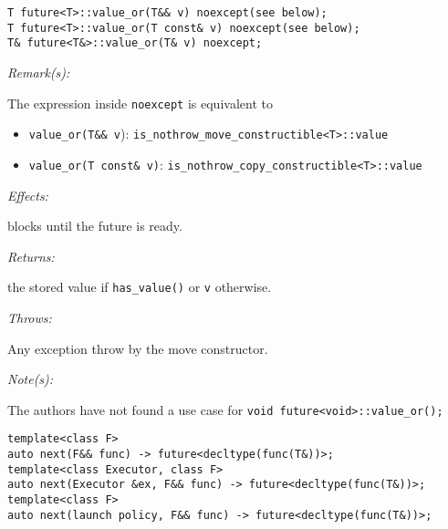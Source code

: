 \documentclass[a4paper,10pt]{article}
\newcommand{\cpp}[1]{\lstinline{#1}}
\newcommand{\wordingItem}[1]{\noindent\textit{#1:}}
\newenvironment{wordingPara}{\begin{adjustwidth}{12pt}{}}{\end{adjustwidth}}
\newenvironment{Effects}{\wordingItem{Effects}\vspace{7pt}\noindent\begin{adjustwidth}{12pt}{}}{\vspace{7pt}\end{adjustwidth}}
\newenvironment{Throws}{\wordingItem{Throws}\vspace{7pt}\noindent\begin{adjustwidth}{12pt}{}}{\vspace{7pt}\end{adjustwidth}}
\newenvironment{Returns}{\wordingItem{Returns}\vspace{7pt}\noindent\begin{adjustwidth}{12pt}{}}{\vspace{7pt}\end{adjustwidth}}
\newenvironment{Remarks}{\wordingItem{Remark(s)}\vspace{7pt}\noindent\begin{adjustwidth}{12pt}{}}{\vspace{7pt}\end{adjustwidth}}
\newenvironment{Notes}{\wordingItem{Note(s)}\vspace{7pt}\noindent\begin{adjustwidth}{12pt}{}}{\vspace{7pt}\end{adjustwidth}}
\newcommand{\update}[1]{\colorbox{update_color}{#1}}
\begin{document}
\begin{lstlisting}[xleftmargin=0pt]
T future<T>::value_or(T&& v) noexcept(see below);
T future<T>::value_or(T const& v) noexcept(see below);
T& future<T&>::value_or(T& v) noexcept;
\end{lstlisting}
\begin{wordingPara}
 
\begin{Remarks}
The expression inside \cpp{noexcept} is equivalent to
\begin{itemize}
\item \cpp{value_or(T&& v}): \cpp{is_nothrow_move_constructible<T>::value}
\item \cpp{value_or(T const& v)}: \cpp{is_nothrow_copy_constructible<T>::value}
\end{itemize}
\end{Remarks}

\begin{Effects}
blocks until the future is ready.
\end{Effects}

\begin{Returns}
the stored value if \cpp{has_value()} or \cpp{v} otherwise.
\end{Returns}

\begin{Throws}
\update{
Any exception throw by the move constructor.
}
\end{Throws}

\begin{Notes}
The authors have not found a use case for  \cpp{void future<void>::value_or();}
\end{Notes}

\end{wordingPara}
\begin{lstlisting}[xleftmargin=0pt]
template<class F> 
auto next(F&& func) -> future<decltype(func(T&))>; 
template<class Executor, class F> 
auto next(Executor &ex, F&& func) -> future<decltype(func(T&))>; 
template<class F> 
auto next(launch policy, F&& func) -> future<decltype(func(T&))>;
\end{lstlisting}
\end{document}
